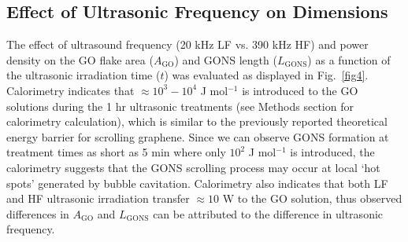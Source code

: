 \subsection{Effect of Ultrasonic Frequency on Dimensions}

The effect of ultrasound frequency (20 kHz LF vs. 390 kHz HF) and power density on the GO flake area ($A_{\mathrm{GO}}$) and GONS length ($L_{\mathrm{GONS}}$) as a function of the ultrasonic irradiation time ($t$) was evaluated as displayed in Fig.~\ref{fig4}. Calorimetry indicates that $\approx10^{3} - 10^{4}$ J mol$^{-1}$ is introduced to the GO solutions during the 1 hr ultrasonic treatments (see Methods section for calorimetry calculation), which is similar to the previously reported theoretical energy barrier for scrolling graphene.\cite{Braga2004,Patra2009} Since we can observe GONS formation at treatment times as short as 5 min where only $10^{2}$ J mol$^{-1}$ is introduced, the calorimetry suggests that the GONS scrolling process may occur at local `hot spots' generated by bubble cavitation.\cite{Suslick1986,Kotronarou1991} Calorimetry also indicates that both LF and HF ultrasonic irradiation transfer $\approx10$ W to the GO solution, thus observed differences in $A_{\mathrm{GO}}$ and $L_{\mathrm{GONS}}$ can be attributed to the difference in ultrasonic frequency.

